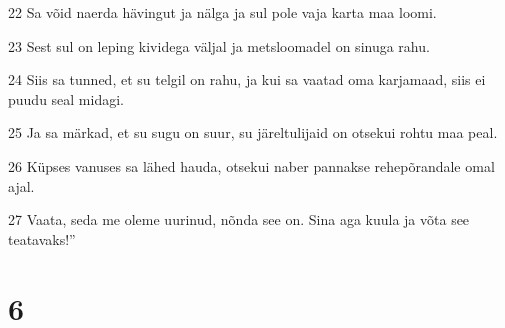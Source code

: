 \par 22 Sa võid naerda hävingut ja nälga ja sul pole vaja karta maa loomi.
\par 23 Sest sul on leping kividega väljal ja metsloomadel on sinuga rahu.
\par 24 Siis sa tunned, et su telgil on rahu, ja kui sa vaatad oma karjamaad, siis ei puudu seal midagi.
\par 25 Ja sa märkad, et su sugu on suur, su järeltulijaid on otsekui rohtu maa peal.
\par 26 Küpses vanuses sa lähed hauda, otsekui naber pannakse rehepõrandale omal ajal.
\par 27 Vaata, seda me oleme uurinud, nõnda see on. Sina aga kuula ja võta see teatavaks!”

\chapter{6}


